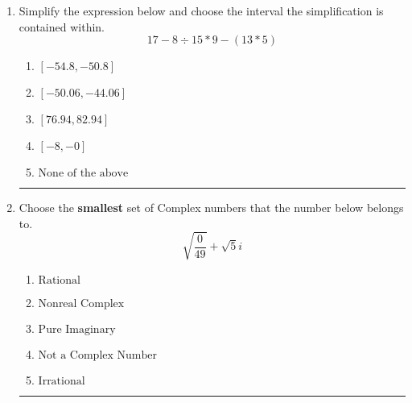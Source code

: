\documentclass[14pt]{extbook}
\newcommand{\litem}[1]{\item#1\hspace*{-1cm}\rule{\textwidth}{0.4pt}}
\begin{document}
\begin{enumerate}
{\begin{enumerate}[label=\Alph*.]
\end{enumerate} }
\litem{
Simplify the expression below and choose the interval the simplification is contained within.\[ 17 - 8 \div 15 * 9 - (13 * 5) \]\begin{enumerate}[label=\Alph*.]
\item \( [-54.8, -50.8] \)
\item \( [-50.06, -44.06] \)
\item \( [76.94, 82.94] \)
\item \( [-8, -0] \)
\item \( \text{None of the above} \)

\end{enumerate} }
\litem{
Choose the \textbf{smallest} set of Complex numbers that the number below belongs to.\[ \sqrt{\frac{0}{49}}+\sqrt{5}i \]\begin{enumerate}[label=\Alph*.]
\item \( \text{Rational} \)
\item \( \text{Nonreal Complex} \)
\item \( \text{Pure Imaginary} \)
\item \( \text{Not a Complex Number} \)
\item \( \text{Irrational} \)

\end{enumerate} }
\end{enumerate}
\end{document}
